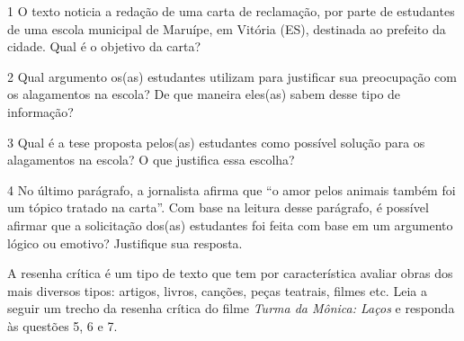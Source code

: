 \num{1} O texto noticia a redação de uma carta de reclamação, por parte
de estudantes de uma escola municipal de Maruípe, em Vitória (ES),
destinada ao prefeito da cidade. Qual é o objetivo da carta?


\num{2} Qual argumento os(as) estudantes utilizam para justificar sua
preocupação com os alagamentos na escola? De que maneira eles(as) sabem
desse tipo de informação?


\num{3} Qual é a tese proposta pelos(as) estudantes como possível
solução para os alagamentos na escola? O que justifica essa escolha?


\num{4} No último parágrafo, a jornalista afirma que ``o amor pelos
animais também foi um tópico tratado na carta''. Com base na leitura
desse parágrafo, é possível afirmar que a solicitação dos(as) estudantes
foi feita com base em um argumento lógico ou emotivo? Justifique sua
resposta.


A resenha crítica é um tipo de texto que tem por característica
avaliar obras dos mais diversos tipos: artigos, livros, canções, peças
teatrais, filmes etc. Leia a seguir um trecho da resenha crítica do
filme \emph{Turma da Mônica: Laços} e responda às questões 5, 6 e 7.


